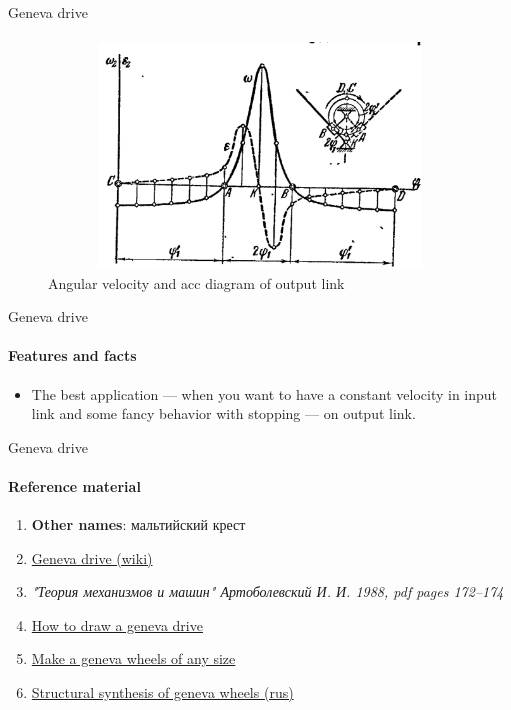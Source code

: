 \documentclass[aspectratio=169]{beamer}
\begin{document}
\begin{frame}[t]{Geneva drive}
\framesubtitle{}
    \vspace{-0.6cm}
    \begin{figure}[H]
        \centering\includegraphics[height=6cm,width=1\textwidth,keepaspectratio]{geneva_plot.png}
        \caption*{Angular velocity and acc diagram of output link}
        \label{fig:geneva_plot.png}
    \end{figure}
\end{frame}



\begin{frame}[t]{Geneva drive}
    \framesubtitle{Features and facts}
    \begin{itemize}
        \item The best application --- when you want to have a constant velocity in input link and some fancy behavior with stopping --- on output link. 
    \end{itemize}
\end{frame}

\begin{frame}[t]{Geneva drive}
    \framesubtitle{Reference material}
    \begin{enumerate}
        \item \textbf{Other names}: мальтийский крест
        \item \href{https://en.wikipedia.org/wiki/Geneva_drive}{Geneva drive (wiki)}
        \item \textit{"Теория механизмов и машин" Артоболевский И. И. 1988, pdf pages 172--174 }
        \item \href{https://www.youtube.com/watch?v=1lyWywC_z4o}{How to draw a geneva drive}
        \item \href{https://www.instructables.com/Make-Geneva-Wheels-of-Any-Size-in-a-Easier-Way/}{Make a geneva wheels of any size}
        \item \href{https://7universum.com/ru/tech/archive/item/5061}{Structural synthesis of geneva wheels (rus)}
    \end{enumerate}
\end{frame}
\end{document}
